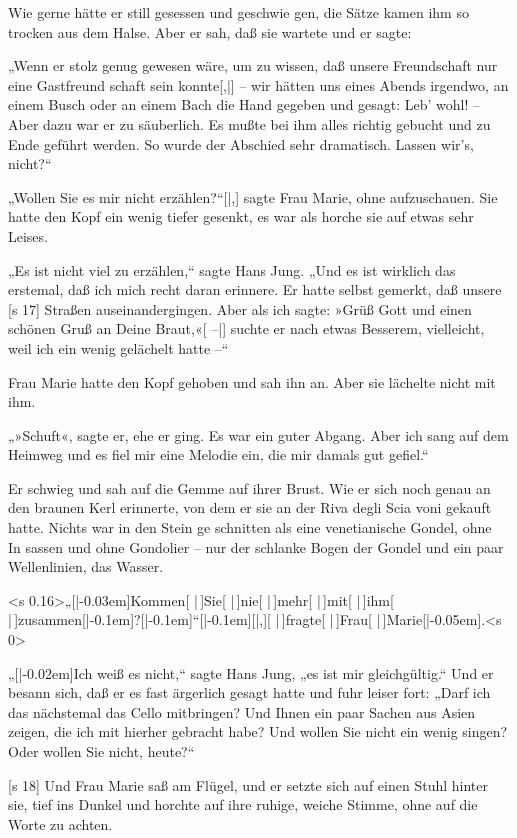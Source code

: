 Wie gerne hätte er still gesessen und geschwie­
gen, die Sätze kamen ihm so trocken aus dem Halse.
Aber er sah, daß sie wartete und er sagte:

„Wenn er stolz genug gewesen wäre, um zu
wissen, daß unsere Freundschaft nur eine Gastfreund­
schaft sein konnte[,|] – wir hätten uns eines Abends
irgendwo, an einem Busch oder an einem Bach die
Hand gegeben und gesagt: Leb' wohl! – Aber dazu
war er zu säuberlich. Es mußte bei ihm alles richtig
gebucht und zu Ende geführt werden. So wurde der
Abschied sehr dramatisch. Lassen wir's, nicht?“

„Wollen Sie es mir nicht erzählen?“[|,] sagte Frau
Marie, ohne aufzuschauen. Sie hatte den Kopf ein
wenig tiefer gesenkt, es war als horche sie auf etwas
sehr Leises.

„Es ist nicht viel zu erzählen,“ sagte Hans Jung.
„Und es ist wirklich das erstemal, daß ich mich recht
daran erinnere. Er hatte selbst gemerkt, daß unsere
[s 17]
Straßen auseinandergingen. Aber als ich sagte: »Grüß
Gott und einen schönen Gruß an Deine Braut,«[ –|]
suchte er nach etwas Besserem, vielleicht, weil ich ein
wenig gelächelt hatte –“

Frau Marie hatte den Kopf gehoben und sah
ihn an. Aber sie lächelte nicht mit ihm.

„»Schuft«, sagte er, ehe er ging. Es war ein
guter Abgang. Aber ich sang auf dem Heimweg
und es fiel mir eine Melodie ein, die mir damals
gut gefiel.“

Er schwieg und sah auf die Gemme auf ihrer
Brust. Wie er sich noch genau an den braunen Kerl
erinnerte, von dem er sie an der Riva degli Scia­
voni gekauft hatte. Nichts war in den Stein ge­
schnitten als eine venetianische Gondel, ohne In­
sassen und ohne Gondolier – nur der schlanke Bogen
der Gondel und ein paar Wellenlinien, das Wasser.

<s 0.16>„[|\kern -0.03em]Kommen[ | ]Sie[ | ]nie[ | ]mehr[ | ]mit[ | ]ihm[ | ]zusammen[|\kern -0.1em]?[|\kern -0.1em]“[|\kern -0.1em][|,][
| ]fragte[ | ]Frau[ | ]Marie[|\kern -0.05em].<s 0>

„[|\kern -0.02em]Ich weiß es nicht,“ sagte Hans Jung, „es ist
mir gleichgültig.“ Und er besann sich, daß er es fast
ärgerlich gesagt hatte und fuhr leiser fort: „Darf ich
das nächstemal das Cello mitbringen? Und Ihnen ein
paar Sachen aus Asien zeigen, die ich mit hierher
gebracht habe? Und wollen Sie nicht ein wenig singen?
Oder wollen Sie nicht, heute?“

[s 18]
Und Frau Marie saß am Flügel, und er setzte
sich auf einen Stuhl hinter sie, tief ins Dunkel und
horchte auf ihre ruhige, weiche Stimme, ohne auf die
Worte zu achten.

